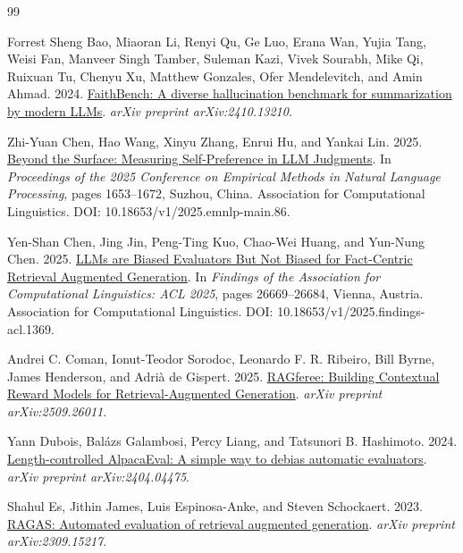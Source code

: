 \begin{thebibliography}{99}

Forrest Sheng Bao, Miaoran Li, Renyi Qu, Ge Luo, Erana Wan, Yujia Tang, Weisi Fan, Manveer Singh Tamber, Suleman Kazi, Vivek Sourabh, Mike Qi, Ruixuan Tu, Chenyu Xu, Matthew Gonzales, Ofer Mendelevitch, and Amin Ahmad. 2024.
\newblock \href{https://arxiv.org/abs/2410.13210}{FaithBench: A diverse hallucination benchmark for summarization by modern LLMs}.
\newblock \emph{arXiv preprint arXiv:2410.13210}.

Zhi-Yuan Chen, Hao Wang, Xinyu Zhang, Enrui Hu, and Yankai Lin. 2025.
\newblock \href{https://aclanthology.org/2025.emnlp-main.86/}{Beyond the Surface: Measuring Self-Preference in LLM Judgments}.
\newblock In \emph{Proceedings of the 2025 Conference on Empirical Methods in Natural Language Processing}, pages 1653--1672, Suzhou, China. Association for Computational Linguistics. DOI: 10.18653/v1/2025.emnlp-main.86.

Yen-Shan Chen, Jing Jin, Peng-Ting Kuo, Chao-Wei Huang, and Yun-Nung Chen. 2025.
\newblock \href{https://aclanthology.org/2025.findings-acl.1369/}{LLMs are Biased Evaluators But Not Biased for Fact-Centric Retrieval Augmented Generation}.
\newblock In \emph{Findings of the Association for Computational Linguistics: ACL 2025}, pages 26669--26684, Vienna, Austria. Association for Computational Linguistics. DOI: 10.18653/v1/2025.findings-acl.1369.

Andrei C. Coman, Ionut-Teodor Sorodoc, Leonardo F. R. Ribeiro, Bill Byrne, James Henderson, and Adri{\`a} de Gispert. 2025.
\newblock \href{https://arxiv.org/abs/2509.26011}{RAGferee: Building Contextual Reward Models for Retrieval-Augmented Generation}.
\newblock \emph{arXiv preprint arXiv:2509.26011}.

Yann Dubois, Bal{\'a}zs Galambosi, Percy Liang, and Tatsunori B. Hashimoto. 2024.
\newblock \href{https://arxiv.org/abs/2404.04475}{Length-controlled AlpacaEval: A simple way to debias automatic evaluators}.
\newblock \emph{arXiv preprint arXiv:2404.04475}.

Shahul Es, Jithin James, Luis Espinosa-Anke, and Steven Schockaert. 2023.
\newblock \href{https://arxiv.org/abs/2309.15217}{RAGAS: Automated evaluation of retrieval augmented generation}.
\newblock \emph{arXiv preprint arXiv:2309.15217}.


\end{thebibliography}
